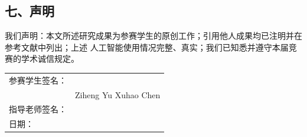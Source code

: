 \subsection*{七、声明}

我们声明：本文所述研究成果为参赛学生的原创工作；引用他人成果均已注明并在参考文献中列出；上述
人工智能使用情况完整、真实；我们已知悉并遵守本届竞赛的学术诚信规定。

\vspace{1.2em}
\noindent
\begin{tabular}{ll}
参赛学生签名： & \underline{\hspace{4.5cm}} \quad \underline{\hspace{4.5cm}} \\[10pt]
              & \hfill Ziheng Yu \hspace{2.2cm} Xuhao Chen \\[14pt]
指导老师签名： & \underline{\hspace{4.5cm}} \\[14pt]
日期：        & \underline{\hspace{4.5cm}} \\
\end{tabular}
